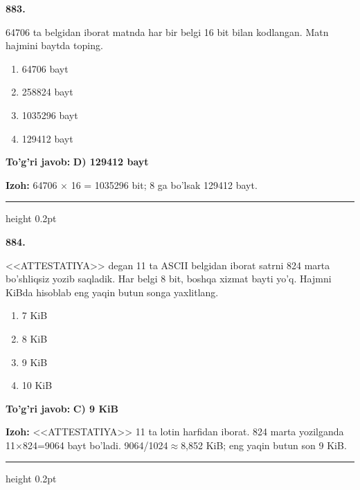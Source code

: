 \documentclass[10pt,a4paper,oneside]{article}
\begin{document}
\noindent\textbf{\color{ink}883.}
\par
64706 ta belgidan iborat matnda har bir belgi 16 bit bilan kodlangan. Matn hajmini baytda toping.
\begin{enumerate}[label=\Alph*),leftmargin=9mm]
\item 64706 bayt
\item 258824 bayt
\item 1035296 bayt
\item 129412 bayt
\end{enumerate}
\begin{tcolorbox}[enhanced,breakable,colback=teal!4,colframe=teal!50!black,boxrule=0.5pt,arc=1.1mm,left=3mm,right=3mm,top=1.7mm,bottom=1.7mm,before skip=2mm,after skip=2mm]
\textbf{\color{teal}To'g'ri javob:} \textbf{D) 129412 bayt}
\par\smallskip
\textbf{Izoh:} 64706 \ensuremath{\times} 16 = 1035296 bit; 8 ga bo'lsak 129412 bayt.
\end{tcolorbox}
\vspace{2mm}\hrule height 0.2pt \vspace{3mm}

\noindent\textbf{\color{ink}884.}
\par
<<ATTESTATIYA>> degan 11 ta ASCII belgidan iborat satrni 824 marta bo'shliqsiz yozib saqladik. Har belgi 8 bit, boshqa xizmat bayti yo'q. Hajmni KiBda hisoblab eng yaqin butun songa yaxlitlang.
\begin{enumerate}[label=\Alph*),leftmargin=9mm]
\item 7 KiB
\item 8 KiB
\item 9 KiB
\item 10 KiB
\end{enumerate}
\begin{tcolorbox}[enhanced,breakable,colback=teal!4,colframe=teal!50!black,boxrule=0.5pt,arc=1.1mm,left=3mm,right=3mm,top=1.7mm,bottom=1.7mm,before skip=2mm,after skip=2mm]
\textbf{\color{teal}To'g'ri javob:} \textbf{C) 9 KiB}
\par\smallskip
\textbf{Izoh:} <<ATTESTATIYA>> 11 ta lotin harfidan iborat. 824 marta yozilganda 11\ensuremath{\times}824=9064 bayt bo'ladi. 9064/1024\ensuremath{\approx}8,852 KiB; eng yaqin butun son 9 KiB.
\end{tcolorbox}
\vspace{2mm}\hrule height 0.2pt \vspace{3mm}
\end{document}
